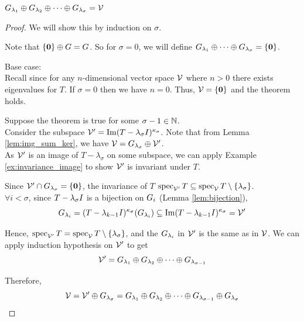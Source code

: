 \begin{theorem}
\(G_{\lambda_1}\oplus G_{\lambda_2}\oplus\dots\oplus G_{\lambda_\sigma}=\mathcal{V}\) \label{theorem:dirsumv}
\end{theorem}
\begin{proof}
    We will show this by induction on $\sigma$.
    
    Note that \(\{\mathbf{0}\}\oplus G=G\). So for \(\sigma=0\), we will define \(G_{\lambda_1}\oplus\dots\oplus G_{\lambda_\sigma}=\{\mathbf{0}\}\).
    
    Base case:\\
    Recall since for any \(n\)-dimensional vector space \(\mathcal{V}\) where \(n > 0\) there exists eigenvalues for \(T\).
    If \(\sigma=0\) then  we have \(n=0\).
    Thus, \(\mathcal{V}=\{\mathbf{0}\}\) and the theorem holds.

    Suppose the theorem is true for some \(\sigma-1\in\mathbb{N}\). \\
    Consider the subspace \(\mathcal{V}'=\operatorname{Im}(T-\lambda_\sigma I)^{\kappa_\sigma}\).
    Note that from Lemma \ref{lem:img_sum_ker}, we have $\mathcal{V} = G_{\lambda_\sigma} \oplus \mathcal{V}'$.\\
    As \(\mathcal{V}'\) is an image of \(T-\lambda_\sigma\) on some subspace, we can apply Example \ref{ex:invariance_image} to show  \(\mathcal{V}'\) is invariant under \(T\).

    Since \(\mathcal{V}'\cap G_{\lambda_\sigma}=\{\mathbf{0}\}\), the invariance of $T$ \(\operatorname{spec}_{\mathcal{V}'}T \subseteq \operatorname{spec}_{\mathcal{V}}T\setminus\{\lambda_\sigma\}\).\\
    \(\forall i<\sigma\), since \(T-\lambda_\sigma I\) is a bijection on \(G_i\) (Lemma \ref{lem:bijection}),
    \begin{equation*}
        G_{\lambda_i}=(T-\lambda_{k-1}I)^{\kappa_\sigma}(G_{\lambda_i})\subseteq\operatorname{Im}(T-\lambda_{k-1}I)^{\kappa_\sigma}=\mathcal{V}'
    \end{equation*}

    Hence, \(\operatorname{spec}_{\mathcal{V}'}T=\operatorname{spec}_{\mathcal{V}}T\setminus\{\lambda_\sigma\}\), and the \(G_{\lambda_i}\) in \(\mathcal{V}'\) is the same as in \(\mathcal{V}\).
    We can apply induction hypothesis on $\mathcal{V}'$ to get
    \begin{equation*}
        \mathcal{V}' = G_{\lambda_1}\oplus G_{\lambda_2}\oplus\dots\oplus G_{\lambda_{\sigma-1}}
    \end{equation*}

    Therefore,
    \begin{equation*}
        \mathcal{V} = \mathcal{V}' \oplus G_{\lambda_\sigma} = G_{\lambda_1}\oplus G_{\lambda_2}\oplus\dots\oplus G_{\lambda_{\sigma-1}} \oplus G_{\lambda_\sigma}
    \end{equation*}

\end{proof}


